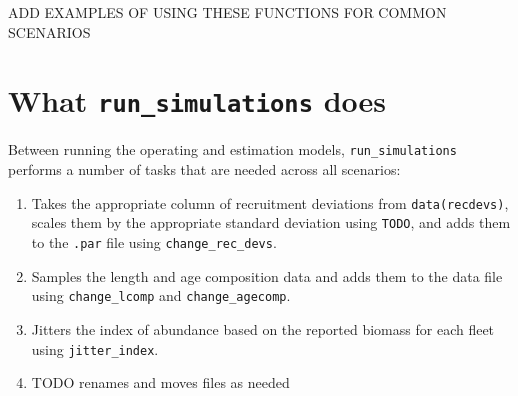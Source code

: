 \documentclass[12pt]{article}
\begin{document}
ADD EXAMPLES OF USING THESE FUNCTIONS FOR COMMON SCENARIOS

\section*{What \texttt{run\_simulations} does}

Between running the operating and estimation models, \texttt{run\_simulations}
performs a number of tasks that are needed across all scenarios:

\begin{enumerate}
  \item Takes the appropriate column of recruitment deviations from
    \texttt{data(recdevs)}, scales them by the appropriate standard deviation
    using \texttt{TODO}, and adds them to the \texttt{.par} file using
    \texttt{change\_rec\_devs}.
  \item Samples the length and age composition data and adds them to the data
    file using \texttt{change\_lcomp} and \texttt{change\_agecomp}.
  \item Jitters the index of abundance based on the reported biomass for each
    fleet using \texttt{jitter\_index}.
  \item TODO renames and moves files as needed
\end{enumerate}







%
\end{document}
